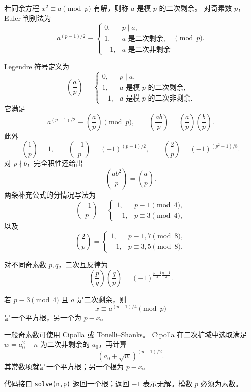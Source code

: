 若同余方程 $x^2\equiv a\pmod p$ 有解，则称 $a$ 是模 $p$ 的二次剩余。
对奇素数 $p$，Euler 判别法为
\[
  a^{(p-1)/2}\equiv
  \begin{cases}
    0,&p\mid a,\\
    1,&a\text{ 是二次剩余},\\
    -1,&a\text{ 是二次非剩余}
  \end{cases}\pmod p.
\]

Legendre 符号定义为
\[
  \left(\frac ap\right)=
  \begin{cases}
    0,&p\mid a,\\
    1,&a\text{ 是模 }p\text{ 的二次剩余},\\
    -1,&a\text{ 是模 }p\text{ 的二次非剩余}.
  \end{cases}
\]
它满足
\[
  a^{(p-1)/2}\equiv\left(\frac ap\right)\pmod p,
  \qquad
  \left(\frac{ab}{p}\right)=\left(\frac ap\right)\left(\frac bp\right).
\]
此外
\[
  \left(\frac1p\right)=1,
  \qquad
  \left(\frac{-1}{p}\right)=(-1)^{(p-1)/2},
  \qquad
  \left(\frac2p\right)=(-1)^{(p^2-1)/8}.
\]
对 $p\nmid b$，完全积性还给出
\[
  \left(\frac{ab^2}{p}\right)=\left(\frac ap\right).
\]
两条补充公式的分情况写法为
\[
  \left(\frac{-1}{p}\right)=
  \begin{cases}
    1,&p\equiv1\pmod4,\\
    -1,&p\equiv3\pmod4,
  \end{cases}
\]
以及
\[
  \left(\frac2p\right)=
  \begin{cases}
    1,&p\equiv1,7\pmod8,\\
    -1,&p\equiv3,5\pmod8.
  \end{cases}
\]

对不同奇素数 $p,q$，二次互反律为
\[
  \left(\frac pq\right)\left(\frac qp\right)
  =(-1)^{\frac{p-1}{2}\frac{q-1}{2}}.
\]

\begin{icpcresult}[特殊模数的平方根]
  若 $p\equiv3\pmod4$ 且 $a$ 是二次剩余，则
  \[
    x\equiv a^{(p+1)/4}\pmod p
  \]
  是一个平方根，另一个为 $p-x$。
\end{icpcresult}

一般奇素数可使用 Cipolla 或 Tonelli--Shanks。
Cipolla 在二次扩域中选取满足 $w=a_0^2-n$ 为二次非剩余的 $a_0$，再计算
\[
  (a_0+\sqrt w)^{(p+1)/2}.
\]
其常数项就是一个平方根；另一个根为 $p-x$。

代码接口 \texttt{solve(n,p)} 返回一个根；返回 $-1$ 表示无解。模数 $p$ 必须为素数。
